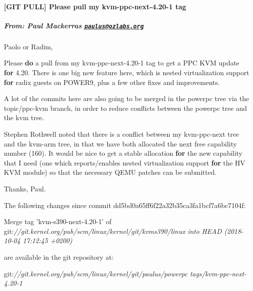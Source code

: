 \documentclass[landscape, 14pt]{report}
\date{}
\newenvironment{Shaded}{}{}
\newcommand{\DecValTok}[1]{\textcolor[rgb]{0.25,0.63,0.44}{#1}}
\newcommand{\FloatTok}[1]{\textcolor[rgb]{0.25,0.63,0.44}{#1}}
\newcommand{\CommentTok}[1]{\textcolor[rgb]{0.38,0.63,0.69}{\textit{#1}}}
\newcommand{\ControlFlowTok}[1]{\textcolor[rgb]{0.00,0.44,0.13}{\textbf{#1}}}
\newcommand{\NormalTok}[1]{#1}
\let\oldparagraph\paragraph
\renewcommand{\paragraph}[1]{\oldparagraph{#1}\mbox{}}
\let\oldsubparagraph\subparagraph
\renewcommand{\subparagraph}[1]{\oldsubparagraph{#1}\mbox{}}
\begin{document}
\paragraph{{[}GIT PULL{]} Please pull my kvm-ppc-next-4.20-1
tag}\label{header-n0}

\subparagraph{\texorpdfstring{From: Paul Mackerras
\href{mailto:paulus@ozlabs.org}{\nolinkurl{paulus@ozlabs.org}}}{From: Paul Mackerras paulus@ozlabs.org}}\label{header-n2}

\begin{Shaded}
\begin{Highlighting}[]
\NormalTok{Paolo or Radim,}

\NormalTok{Please }\ControlFlowTok{do}\NormalTok{ a pull from my kvm-ppc-next}\FloatTok{-4.20}\DecValTok{-1}\NormalTok{ tag to get a PPC KVM}
\NormalTok{update }\ControlFlowTok{for} \DecValTok{4}\NormalTok{.}\FloatTok{20.}\NormalTok{  There is one big new feature here, which is nested}
\NormalTok{virtualization support }\ControlFlowTok{for}\NormalTok{ radix guests on POWER9, plus a few other}
\NormalTok{fixes and improvements.}

\NormalTok{A lot of the commits here are also going to be merged in the powerpc}
\NormalTok{tree via the topic/ppc-kvm branch, in order to reduce conflicts}
\NormalTok{between the powerpc tree and the kvm tree.}

\NormalTok{Stephen Rothwell noted that there is a conflict between my}
\NormalTok{kvm-ppc-next tree and the kvm-arm tree, in that we have both allocated}
\NormalTok{the next free capability number (}\DecValTok{160}\NormalTok{).  It would be nice to get a}
\NormalTok{stable allocation }\ControlFlowTok{for}\NormalTok{ the new capability that I need (one which}
\NormalTok{reports/enables nested virtualization support }\ControlFlowTok{for}\NormalTok{ the HV KVM module)}
\NormalTok{so that the necessary QEMU patches can be submitted.}

\NormalTok{Thanks,}
\NormalTok{Paul.}

\NormalTok{The following changes since commit dd5bd0a65ff6f22a32b35ca3fa1bcf7a6bc7104f:}

\NormalTok{  Merge tag 'kvm-s390-next}\FloatTok{-4.20}\DecValTok{-1}\NormalTok{' of git:}\CommentTok{//git.kernel.org/pub/scm/linux/kernel/git/kvms390/linux into HEAD (2018-10-04 17:12:45 +0200)}

\NormalTok{are available in the git repository at:}

\NormalTok{  git:}\CommentTok{//git.kernel.org/pub/scm/linux/kernel/git/paulus/powerpc tags/kvm-ppc-next-4.20-1}


\end{Highlighting}
\end{Shaded}
\end{document}
